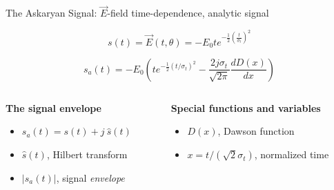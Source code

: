 \documentclass{beamer}
\begin{document}
\begin{frame}{The Askaryan Signal: $\vec{E}$-field time-dependence, analytic signal}
\begin{tcolorbox}[colback=box_background,colframe=box_frame,title={Askaryan electric field, $\vec{E}(r,t)$, [V m$^{-1}$], time-dependence}]
\begin{equation}
s(t) = \vec{E}(t,\theta) = -E_0 t e^{-\frac{1}{2}\left(\frac{t}{\sigma_t}\right)^2}
\end{equation}
\end{tcolorbox}
\begin{tcolorbox}[colback=box_background,colframe=box_frame,title={Askaryan electric field \textit{analytic signal}}]
\begin{equation}
s_a(t) = -E_0 \left(t e^{-\frac{1}{2}\left(t/\sigma_t\right)^2} - \frac{2 j\sigma_t}{\sqrt{2\pi}} \frac{dD(x)}{dx}\right)
\end{equation}
\end{tcolorbox}
\footnotesize
\begin{columns}[T]
\begin{column}{0.49\textwidth}
\textbf{The signal envelope}
\begin{itemize}
\item $s_a(t) = s(t) + j ~ \widehat{s}(t)$
\item $\widehat{s}(t)$, Hilbert transform
\item $|s_a(t)|$, signal \textit{envelope}
\end{itemize}
\end{column}
\begin{column}{0.49\textwidth}
\textbf{Special functions and variables}
\begin{itemize}
\item $D(x)$, Dawson function
\item $x = t/(\sqrt{2}\sigma_t)$, normalized time
\end{itemize}
\end{column}
\end{columns}
\end{frame}
\end{document}

